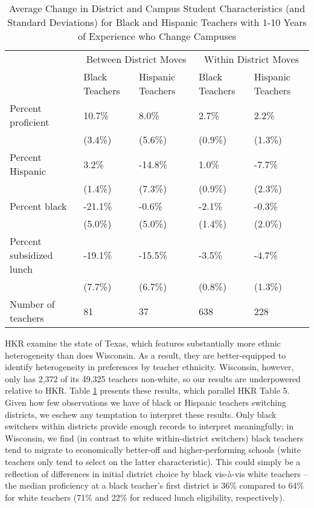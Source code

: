 \begin{table}[htbp]
\centering
\begin{tabular}{lp{}p{}p{}p{}}
  \hline
 & \multicolumn{2}{c}{Between District Moves} & \multicolumn{2}{c}{Within District Moves}\\ \cline{2-5}
 & Black Teachers & Hispanic Teachers & Black Teachers & Hispanic Teachers \\
  \hline
Percent proficient & 10.7\% & 8.0\% & 2.7\% & 2.2\% \\ 
   & (3.4\%) & (5.6\%) & (0.9\%) & (1.3\%) \\ 
  Percent Hispanic & 3.2\% & -14.8\% & 1.0\% & -7.7\% \\ 
   & (1.4\%) & (7.3\%) & (0.9\%) & (2.3\%) \\ 
  Percent black & -21.1\% & -0.6\% & -2.1\% & -0.3\% \\ 
   & (5.0\%) & (5.0\%) & (1.4\%) & (2.0\%) \\ 
  Percent subsidized lunch & -19.1\% & -15.5\% & -3.5\% & -4.7\% \\ 
   & (7.7\%) & (6.7\%) & (0.8\%) & (1.3\%) \\ 
  Number of teachers & 81 & 37 & 638 & 228 \\ 
   \hline
\end{tabular}
\caption{Average Change in District and Campus Student Characteristics (and Standard Deviations) for Black and Hispanic Teachers with 1-10 Years of Experience who Change Campuses} 
\label{tbl:change_by_eth}
\end{table}

HKR examine the state of Texas, which features substantially more ethnic
heterogeneity than does Wisconsin. As a result, they are better-equipped
to identify heterogeneity in preferences by teacher ethnicity.
Wisconsin, however, only has 2,372 of its 49,325 teachers non-white, so
our results are underpowered relative to HKR. Table
\ref{tbl:change_by_eth} presents these results, which parallel HKR Table
5. Given how few observations we have of black or Hispanic teachers
switching districts, we eschew any temptation to interpret these
results. Only black switchers within districts provide enough records to
interpret meaningfully; in Wisconsin, we find (in contrast to white
within-district switchers) black teachers tend to migrate to
economically better-off and higher-performing schools (white teachers
only tend to select on the latter characteristic). This could simply be
a reflection of differences in initial district choice by black
vis-à-vis white teachers -- the median proficiency at a black teacher's
first district is 36\% compared to 64\% for white teachers (71\% and
22\% for reduced lunch eligibility, respectively).

